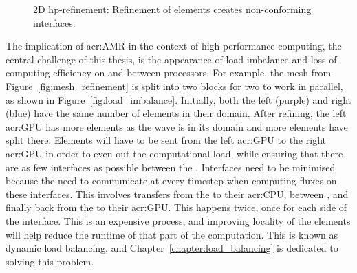 \begin{figure}[H]
    \centering
    
    \caption{2D hp-refinement: Refinement of elements creates non-conforming interfaces.}\label{fig:hp-refinement}
\end{figure}

The implication of \acrshort{acr:AMR} in the context of high performance computing, the central
challenge of this thesis, is the appearance of load imbalance and loss of computing efficiency on
and between processors. For example, the mesh from Figure~\ref{fig:mesh_refinement} is split into
two blocks for two  to work in parallel, as shown in
Figure~\ref{fig:load_imbalance}. Initially, both the left (purple) and right (blue)
 have the same number of elements in their domain. After refining, the left
\acrshort{acr:GPU} has more elements as the wave is in its domain and more elements have split
there. Elements will have to be sent from the left \acrshort{acr:GPU} to the right
\acrshort{acr:GPU} in order to even out the computational load, while ensuring that there are as few
interfaces as possible between the . Interfaces need to be minimised because the
 need to communicate at every timestep when computing fluxes on these
interfaces. This involves transfers from the  to their \acrshort{acr:CPU},
between , and finally back from the  to their
\acrshort{acr:GPU}. This happens twice, once for each side of the interface. This is an expensive
process, and improving locality of the elements will help reduce the runtime of that part of the
computation. This is known as dynamic load balancing, and Chapter~\ref{chapter:load_balancing} is
dedicated to solving this problem.

